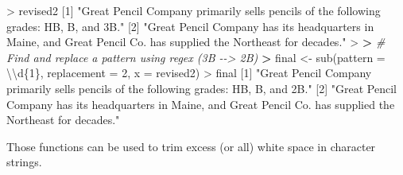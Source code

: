 \documentclass[
]{book}
\newenvironment{Shaded}{\begin{snugshade}}{\end{snugshade}}
\newcommand{\AttributeTok}[1]{\textcolor[rgb]{0.77,0.63,0.00}{#1}}
\newcommand{\CommentTok}[1]{\textcolor[rgb]{0.56,0.35,0.01}{\textit{#1}}}
\newcommand{\DecValTok}[1]{\textcolor[rgb]{0.00,0.00,0.81}{#1}}
\newcommand{\ErrorTok}[1]{\textcolor[rgb]{0.64,0.00,0.00}{\textbf{#1}}}
\newcommand{\FunctionTok}[1]{\textcolor[rgb]{0.00,0.00,0.00}{#1}}
\newcommand{\NormalTok}[1]{#1}
\newcommand{\OtherTok}[1]{\textcolor[rgb]{0.56,0.35,0.01}{#1}}
\newcommand{\SpecialCharTok}[1]{\textcolor[rgb]{0.00,0.00,0.00}{#1}}
\newcommand{\StringTok}[1]{\textcolor[rgb]{0.31,0.60,0.02}{#1}}
\begin{document}
\begin{Shaded}
\begin{Highlighting}[]
\SpecialCharTok{\textgreater{}}\NormalTok{ revised2}
\NormalTok{[}\DecValTok{1}\NormalTok{] }\StringTok{"Great Pencil Company primarily sells pencils of the following grades: HB, B, and 3B."}                            
\NormalTok{[}\DecValTok{2}\NormalTok{] }\StringTok{"Great Pencil Company has its headquarters in Maine, and Great Pencil Co. has supplied the Northeast for decades."}
\SpecialCharTok{\textgreater{}} 
\ErrorTok{\textgreater{}} \CommentTok{\# Find and replace a pattern using regex (3B {-}{-}\textgreater{} 2B)}
\ErrorTok{\textgreater{}}\NormalTok{ final }\OtherTok{\textless{}{-}} \FunctionTok{sub}\NormalTok{(}\AttributeTok{pattern =} \StringTok{\textquotesingle{}}\SpecialCharTok{\textbackslash{}\textbackslash{}}\StringTok{d\{1\}\textquotesingle{}}\NormalTok{, }\AttributeTok{replacement =} \StringTok{\textquotesingle{}2\textquotesingle{}}\NormalTok{, }\AttributeTok{x =}\NormalTok{ revised2)}
\SpecialCharTok{\textgreater{}}\NormalTok{ final}
\NormalTok{[}\DecValTok{1}\NormalTok{] }\StringTok{"Great Pencil Company primarily sells pencils of the following grades: HB, B, and 2B."}                            
\NormalTok{[}\DecValTok{2}\NormalTok{] }\StringTok{"Great Pencil Company has its headquarters in Maine, and Great Pencil Co. has supplied the Northeast for decades."}
\end{Highlighting}
\end{Shaded}

Those functions can be used to trim excess (or all) white space in character strings.
\end{document}
